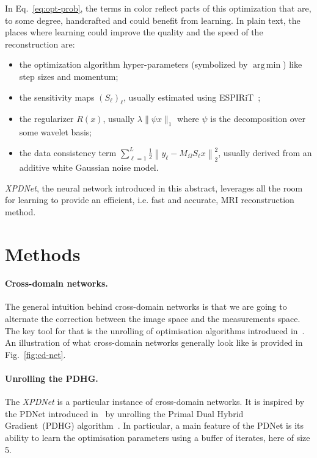 \documentclass{article}
\begin{document}
In Eq.~\eqref{eq:opt-prob}, the terms in color reflect parts of this optimization that are, to some degree, handcrafted and could benefit from learning.
In plain text, the places where learning could improve the quality and the speed of the reconstruction are:
\begin{itemize}
    \item the optimization algorithm hyper-parameters (symbolized by $\operatorname{arg\,min}$) like step sizes and momentum;
    \item the sensitivity maps $(S_{\ell})_\ell$, usually estimated using ESPIRiT~\cite{Uecker2014ESPIRiT-AnAccess};
    \item the regularizer $R(x)$, usually $\lambda \|\psi x\|_1$ where $\psi$ is the decomposition over some wavelet basis;
    \item the data consistency term $\sum_{\ell=1}^L \frac{1}{2}\left\|y_{\ell}-M_{\Omega} S_{\ell} x\right\|_{2}^{2}$, usually derived from an additive white Gaussian noise model.
\end{itemize}

\emph{XPDNet}, the neural network introduced in this abstract, leverages all the room for learning to provide an efficient, i.e. fast and accurate, MRI reconstruction method.
 
\section{Methods}

\paragraph{Cross-domain networks.}
The general intuition behind cross-domain networks is that we are going to alternate the correction between the image space and the measurements space.
The key tool for that is the unrolling of optimisation algorithms introduced in~\cite{Gregor2010}.
An illustration of what cross-domain networks generally look like is provided in Fig.~\ref{fig:cd-net}.

\paragraph{Unrolling the PDHG.}The \emph{XPDNet} is a particular instance of cross-domain networks.
It is inspired by the PDNet introduced in~\cite{Adler2018} by unrolling the Primal Dual Hybrid Gradient~(PDHG) algorithm~\cite{Chambolle2011}.
In particular, a main feature of the PDNet is its ability to learn the optimisation parameters using a buffer of iterates, here of size 5.
\end{document}
